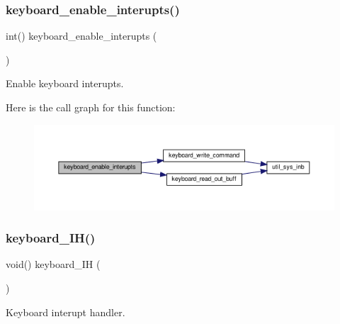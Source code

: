 \subsubsection{\texorpdfstring{keyboard\+\_\+enable\+\_\+interupts()}{keyboard\_enable\_interupts()}}
{\footnotesize\ttfamily int() keyboard\+\_\+enable\+\_\+interupts (\begin{DoxyParamCaption}{ }\end{DoxyParamCaption})}



Enable keyboard interupts. 

Here is the call graph for this function\+:\nopagebreak
\begin{figure}[H]
\begin{center}
\leavevmode
\includegraphics[width=350pt]{group__keyboard_ga0f2b9c07b7d16125c5fb2e05d9427e76_cgraph}
\end{center}
\end{figure}
\mbox{\label{group__keyboard_gabb14446976ac2fcfaf095866f58d28ce}} 
\subsubsection{\texorpdfstring{keyboard\+\_\+\+I\+H()}{keyboard\_IH()}}
{\footnotesize\ttfamily void() keyboard\+\_\+\+IH (\begin{DoxyParamCaption}{ }\end{DoxyParamCaption})}



Keyboard interupt handler. 

